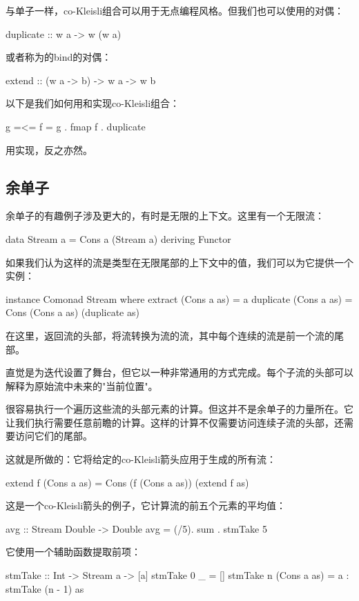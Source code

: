 \documentclass[DaoFP]{subfiles}
\begin{document}
与单子一样，co-Kleisli组合可以用于无点编程风格。但我们也可以使用的对偶：
\begin{haskell}
  duplicate :: w a -> w (w a)
\end{haskell}
或者称为的bind的对偶：
\begin{haskell}
  extend :: (w a -> b) -> w a -> w b
\end{haskell}
以下是我们如何用和实现co-Kleisli组合：
\begin{haskell}
   g =<= f = g . fmap f . duplicate
\end{haskell}
\begin{exercise}
用实现，反之亦然。
\end{exercise}
\subsection{余单子}
余单子的有趣例子涉及更大的，有时是无限的上下文。这里有一个无限流：
\begin{haskell}
data Stream a = Cons a (Stream a)
    deriving Functor
\end{haskell}

如果我们认为这样的流是类型在无限尾部的上下文中的值，我们可以为它提供一个实例：
\begin{haskell}
instance Comonad Stream where
  extract (Cons a as) = a
  duplicate (Cons a as) = Cons (Cons a as) (duplicate as)
\end{haskell}
在这里，返回流的头部，将流转换为流的流，其中每个连续的流是前一个流的尾部。

直觉是为迭代设置了舞台，但它以一种非常通用的方式完成。每个子流的头部可以解释为原始流中未来的"当前位置"。

很容易执行一个遍历这些流的头部元素的计算。但这并不是余单子的力量所在。它让我们执行需要任意前瞻的计算。这样的计算不仅需要访问连续子流的头部，还需要访问它们的尾部。

这就是所做的：它将给定的co-Kleisli箭头应用于生成的所有流：
\begin{haskell}
  extend f (Cons a as) = Cons (f (Cons a as)) (extend f as)
\end{haskell}

这是一个co-Kleisli箭头的例子，它计算流的前五个元素的平均值：
\begin{haskell}
avg :: Stream Double -> Double
avg  = (/5). sum . stmTake 5
\end{haskell}
它使用一个辅助函数提取前项：
\begin{haskell}
stmTake :: Int -> Stream a -> [a]
stmTake 0 _ = []
stmTake n (Cons a as) = a : stmTake (n - 1) as
\end{haskell}
\end{document}
